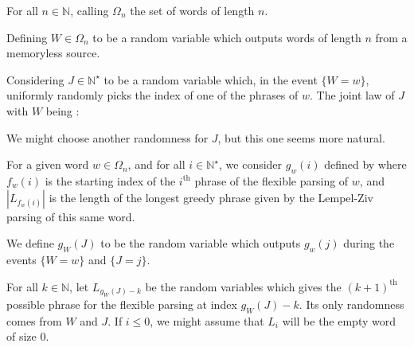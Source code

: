 \label{app:definitions}

\begin{df}
For all $n\in\mathbb{N}$, calling $\Omega_n$ the set 
of words of length $n$.
\end{df}

\begin{df}
Defining $W \in \Omega_n$ to be a random variable which outputs 
words of length $n$ from a memoryless source.
\end{df}

\begin{df}
Considering $J \in \mathbb{N}^{\star}$ to be a random
variable which, in the event $\{ W = w \}$,
uniformly randomly picks the index of
one of the phrases of $w$.
The joint law of $J$ with $W$ being :

\end{df}

\begin{rmk}
We might choose another randomness for $J$, but this one seems
more natural.
\end{rmk}

\begin{df}
For a given word $w\in\Omega_n$, 
and for all $i\in\mathbb{N}^{\star}$, 
we consider $g_w(i)$ defined by
where $f_w(i)$ is the starting index
of the $i^{\text{th}}$ phrase of the flexible parsing of $w$,
and $|L_{f_w(i)}|$ is the length of the longest greedy phrase
given by the Lempel-Ziv parsing of this same word.
\end{df}

\begin{df}
We define $g_{\scriptscriptstyle W}(J)$ to be the random variable which
outputs $g_w(j)$ during the events $\{ W=w \}$ and $\{ J = j \}$.
\end{df}

\begin{df}
For all $k \in \mathbb{N}$, let $L_{g_{\scriptscriptstyle W}(J) - k}$ be the random
variables which gives the $(k+1)^{\text{th}}$ possible phrase 
for the flexible parsing at index $g_{\scriptscriptstyle W}(J) - k$. 
Its only randomness comes from $W$ and $J$. 
If $i\leq 0$, we might assume that $L_i$ will be the empty word of 
size 0.
\end{df}


